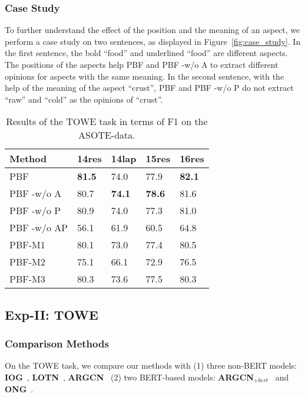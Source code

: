 \documentclass[11pt]{article}
\begin{document}
\subsubsection{Case  Study}
To further understand the effect of the position and the meaning of an aspect, we perform a case study on two sentences, as displayed in Figure~\ref{fig:case_study}. In the first sentence, the bold ``food'' and underlined ``food'' are different aspects. The positions of the aspects help PBF and PBF -w/o A to extract different opinions for aspects with the same meaning. In the second sentence, with the help of the meaning of the aspect ``crust'', PBF and PBF -w/o P do not extract ``raw'' and ``cold'' as the opinions of ``crust''.

\begin{table}
	\centering
	\begin{tabular}{|l|l|l|l|l|}
		\hline
		Method      & 14res         & 14lap         & 15res         & 16res         \\ \hline
		PBF         & \textbf{81.5} & 74.0            & 77.9          & \textbf{82.1} \\ \hline
		PBF -w/o A  & 80.7          & \textbf{74.1} & \textbf{78.6} & 81.6          \\ \hline
		PBF -w/o P  & 80.9          & 74.0            & 77.3          & 81.0            \\ \hline
		PBF -w/o AP & 56.1          & 61.9          & 60.5          & 64.8          \\ \hline
		PBF-M1      & 80.1          & 73.0            & 77.4          & 80.5          \\ \hline
		PBF-M2      & 75.1          & 66.1          & 72.9          & 76.5          \\ \hline
		PBF-M3      & 80.3          & 73.6          & 77.5          & 80.3          \\ \hline
	\end{tabular}
	\caption{\label{table:TOWE-ASOTE-data} Results of the TOWE task in terms of F1 on the ASOTE-data. }
\end{table}

\subsection{Exp-II: TOWE}
\subsubsection{Comparison Methods}
On the TOWE task, we compare our methods with (1) three non-BERT models: \textbf{IOG}~\citep{fan2019target}, \textbf{LOTN}~\citep{wu2020latent}, \textbf{ARGCN}~\citep{jiang-etal-2021-attention} (2) two BERT-based models: \textbf{ARGCN$_{+bert}$}~\citep{jiang-etal-2021-attention} and \textbf{ONG}~\citep{pouran-ben-veyseh-etal-2020-introducing}.
\end{document}
